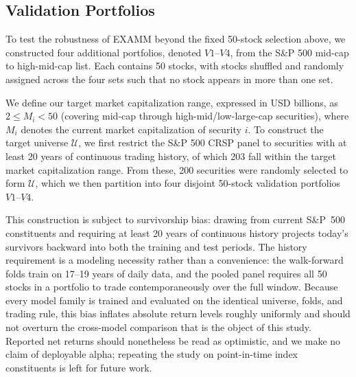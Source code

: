 \subsection{Validation Portfolios}
\label{subsec:validation-portfolios}
To test the robustness of EXAMM beyond the fixed 50-stock selection above, we constructed four additional portfolios, denoted $V1$--$V4$, from the S\&P 500 mid-cap to high-mid-cap list. Each contains 50 stocks, with stocks shuffled and randomly assigned across the four sets such that no stock appears in more than one set.

We define our target market capitalization range, expressed in USD billions, as $2 \le M_i < 50$ (covering mid-cap through high-mid/low-large-cap securities), where $M_i$ denotes the current market capitalization of security $i$. To construct the target universe $\mathcal{U}$, we first restrict the S\&P 500 CRSP panel to securities with at least 20 years of continuous trading history, of which 203 fall within the target market capitalization range. From these, 200 securities were randomly selected to form $\mathcal{U}$, which we then partition into four disjoint 50-stock validation portfolios $V1$--$V4$.

This construction is subject to survivorship bias: drawing from current S\&P~500 constituents and requiring at least 20 years of continuous history projects today's survivors backward into both the training and test periods. The history requirement is a modeling necessity rather than a convenience: the walk-forward folds train on 17--19 years of daily data, and the pooled panel requires all 50 stocks in a portfolio to trade contemporaneously over the full window. Because every model family is trained and evaluated on the identical universe, folds, and trading rule, this bias inflates absolute return levels roughly uniformly and should not overturn the cross-model comparison that is the object of this study. Reported net returns should nonetheless be read as optimistic, and we make no claim of deployable alpha; repeating the study on point-in-time index constituents is left for future work.



